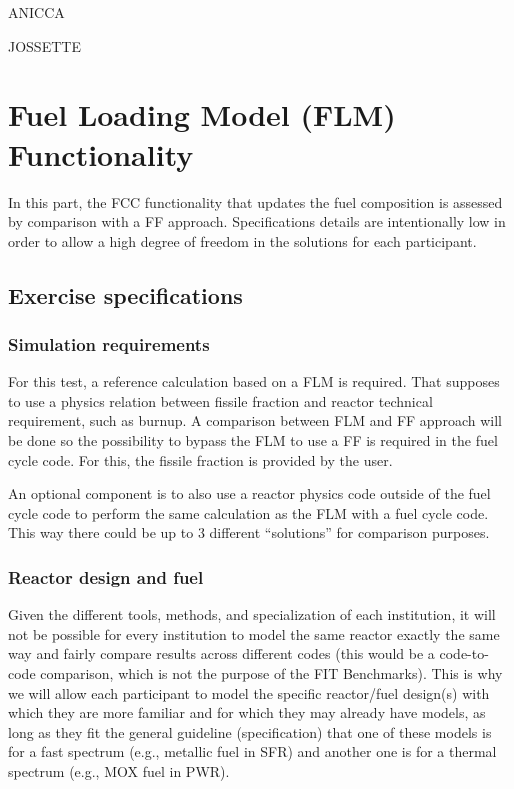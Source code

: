 \documentclass[review]{elsarticle}
\begin{document}
ANICCA

JOSSETTE

\section{Fuel Loading Model (FLM) Functionality}

In this part, the FCC functionality that updates the fuel composition is assessed by comparison with a FF approach. Specifications details are intentionally low in order to allow a high degree of freedom in the solutions for each participant. 

\subsection{Exercise specifications}

\subsubsection{Simulation requirements}

For this test, a reference calculation based on a FLM is required. That supposes to use a physics relation between fissile fraction and reactor technical requirement, such as burnup. A comparison between FLM and FF approach will be done so the possibility to bypass the FLM to use a FF is required in the fuel cycle code. For this, the fissile fraction is provided by the user. 

An optional component is to also use a reactor physics code outside of the fuel cycle code to perform the same calculation as the FLM with a fuel cycle code. This way there could be up to 3 different “solutions” for comparison purposes.

\subsubsection{Reactor design and fuel}

Given the different tools, methods, and specialization of each institution, it will not be possible for every institution to model the same reactor exactly the same way and fairly compare results across different codes (this would be a code-to-code comparison, which is not the purpose of the FIT Benchmarks). This is why we will allow each participant to model the specific reactor/fuel design(s) with which they are more familiar and for which they may already have models, as long as they fit the general guideline (specification) that one of these models is for a fast spectrum (e.g., metallic fuel in SFR) and another one is for a thermal spectrum (e.g., MOX fuel in PWR).
\end{document}
